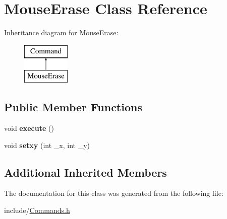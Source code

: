 \hypertarget{classMouseErase}{\section{Mouse\-Erase Class Reference}
\label{classMouseErase}
}
Inheritance diagram for Mouse\-Erase\-:\begin{figure}[H]
\begin{center}
\leavevmode
\includegraphics[height=2.000000cm]{classMouseErase}
\end{center}
\end{figure}
\subsection*{Public Member Functions}
\begin{DoxyCompactItemize}
\item 
\hypertarget{classMouseErase_aef419827cbeabf7fa59f1c73bff8b547}{void {\bfseries execute} ()}\label{classMouseErase_aef419827cbeabf7fa59f1c73bff8b547}

\item 
\hypertarget{classMouseErase_af98ce0f385ea242531537ab43a17f1ce}{void {\bfseries setxy} (int \-\_\-x, int \-\_\-y)}\label{classMouseErase_af98ce0f385ea242531537ab43a17f1ce}

\end{DoxyCompactItemize}
\subsection*{Additional Inherited Members}


The documentation for this class was generated from the following file\-:\begin{DoxyCompactItemize}
\item 
include/\hyperlink{Commands_8h}{Commands.\-h}\end{DoxyCompactItemize}
